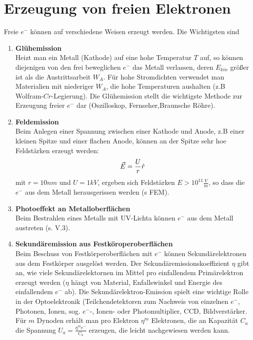 \section{Erzeugung von freien Elektronen} %
\label{sec:Erzeugung_von_freien_Elektronen}
Freie $e^-$ können auf verschiedene Weisen erzeugt werden. Die Wichtigsten
sind

\begin{enumerate}
    \item \textbf{Glühemission} \\
    Heizt man ein Metall (Kathode) auf eine hohe Temperatur $T$ auf, so können
    diejenigen von den frei beweglichen $e^-$ das  Metall verlassen, deren
    $E_{kin}$ größer ist als die Austrittsarbeit $W_A$.
    Für hohe Stromdichten verwendet man Materialien mit niederiger $W_A$, die
    hohe Temperaturen aushalten (z.B Wolfram-$Cr$-Legierung). Die Glühemission
    stellt die wichtigste Methode zur Erzeugung freier $e^-$ dar (Oszilloskop,
    Fernseher,Braunsche Röhre).
    \item \textbf{Feldemission} \\
    Beim Anlegen einer Spannung zwischen einer Kathode und Anode, z.B einer
    kleinen Spitze und einer flachen Anode, können an der Spitze sehr hoe
    Feldstärken erzeugt werden:
    \begin{equation*}
        \vec{E} = \frac{U}{r}  \hat{r}
    \end{equation*}
    mit $r=10nm$ und $U=1kV$, ergeben sich Feldstärken $E > 10^{11}
    \frac{V}{m}$, so dass die $e^-$ aus dem Metall herausgerissen werden (s
    FEM).
    \item \textbf{Photoeffekt an Metalloberflächen} \\
    Beim Bestrahlen eines Metalls mit UV-Lichta können $e^-$ aus dem Metall
    austreten (s. V.3).
    \item \textbf{Sekundäremission aus Festköroperoberflächen} \\
    Beim Beschuss von Festkörperoberflächen mit $e^-$ können Sekundärelektronen
    aus dem Festkörper ausgelöst werden. Der Sekundäremissionskoeffizient $\eta$
    gibt an, wie viele Sekundärelektornen im Mittel pro einfallendem
    Primärelektron erzeugt werden ($\eta$ hängt von Material, Enfallswinkel und
    Energie des einfallendem $e^-$ ab).
    Die Sekundärelektron-Emission spielt eine wichtige Rolle in der
    Optoelektronik (Teilchendetektoren zum Nachweis von einzelnen $e^-$,
    Photonen, Ionen, sog. $e^-$-, Ionen- oder Photomultiplier, CCD,
    Bildverstärker. Für $m$ Dynoden erhält man pro Elektron $\eta^m$
    Elektronen, die an Kapazität $C_a$ die Spannung $U_a = \frac{\eta^m
    e^-}{C_a}$ erzeugen, die leicht nachgewiesen werden kann.
\end{enumerate}

